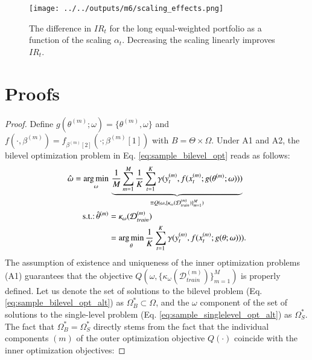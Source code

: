 \documentclass[3p,times,twocolumn]{elsarticle}
\newtheorem{proof}{Proof of Proposition}
\begin{document}
\begin{figure}[!htbp]
    \centering
    \texttt{[image: ../../outputs/m6/scaling\_effects.png]}
    \caption{
        The difference in $IR_{t}$ for the long equal-weighted portfolio as a function of the scaling $\alpha_{t}$.
        Decreasing the scaling linearly improves $IR_{t}$.
    }
    \label{fig:scaling_effects}
\end{figure}

\section{Proofs}\label{section:proofs}

\begin{proof}
    Define $g(\theta^{(m)};\omega)=\{\theta^{(m)},\omega\}$ and $f(\cdot,\beta^{(m)})=f_{\beta^{(m)}[2]}(\cdot;\beta^{(m)}[1])$ with $B=\Theta \times \Omega$.
    Under A1 and A2, the bilevel optimization problem in Eq. \ref{eq:sample_bilevel_opt} reads as follows:
    \begin{equation}\label{eq:sample_bilevel_opt_alt}
        \begin{split}
            \hat{\omega}  =  \underset{\omega}{\arg\min} &\, \underbrace{\dfrac{1}{M} \sum_{m=1}^{M}   \dfrac{1}{K}\sum_{t=1}^{K} \gamma( y_{t}^{(m)}, f(x_{t}^{(m)};g(\theta^{(m)};\omega)))}_{\equiv Q(\omega,\{\kappa_{\omega}(\mathcal{D}_{train}^{(m)})\}_{m=1}^{M})}\\
            \textnormal{s.t.:} \,\hat{\theta}^{(m)} &= \kappa_{\omega} (\mathcal{D}_{train}^{(m)}) \\
            &= \underset{\theta}{\arg\min} \,  \dfrac{1}{K}\sum_{t=1}^{K} \gamma( y_{t}^{(m)}, f(x_{t}^{(m)};g(\theta;\omega))).\\
        \end{split}
    \end{equation}
    The assumption of existence and uniqueness of the inner optimization problems (A1) guarantees that the objective $Q(\omega,\{\kappa_{\omega}(\mathcal{D}_{train}^{(m)})\}_{m=1}^{M})$ is properly defined.
    Let us denote the set of solutions to the bilevel problem (Eq. \ref{eq:sample_bilevel_opt_alt}) as $\Omega_{B}^{*}\subset \Omega$, and the $\omega$ component of the set of solutions to the single-level problem (Eq. \ref{eq:sample_singlelevel_opt_alt}) as $\Omega_{S}^{*}$. 
    The fact that $ \Omega_{B}^{*} = \Omega_{S}^{*}$ directly stems from the fact that the individual components $(m)$ of the outer optimization objective $Q(\cdot)$ coincide with the inner optimization objectives:


\end{proof}
\end{document}
